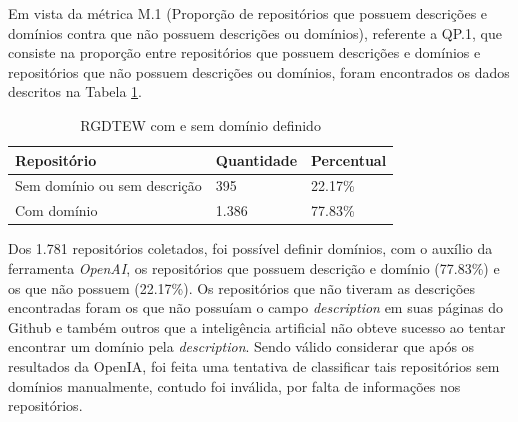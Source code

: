 \documentclass[12pt]{article}
\begin{document}
Em vista da métrica M.1 (Proporção de repositórios que possuem descrições e domínios contra que não possuem descrições ou domínios), referente a QP.1, que consiste na proporção entre repositórios que possuem descrições e domínios e repositórios que não possuem descrições ou domínios, foram encontrados os dados descritos na Tabela \ref{tab:descricao x sem descricao}{}.
\begin{table}[ht]
    \caption{RGDTEW com e sem domínio definido}
    \centering
    \label{tab:descricao x sem descricao}
        \begin{tabular}{|l|l|l|}
        \hline
        Repositório & Quantidade & Percentual\\
        \hline
        Sem domínio ou sem descrição & 395 & 22.17\%\\
        \hline
        Com domínio & 1.386 & 77.83\%\\
        \hline
        \end{tabular}
\end{table}
Dos 1.781 repositórios coletados, foi possível definir domínios, com o auxílio da ferramenta \emph{OpenAI}, os repositórios que possuem descrição e domínio (77.83\%) e os que não possuem (22.17\%). Os repositórios que não tiveram as descrições encontradas foram os que não possuíam o campo \emph{description} em suas páginas do Github e também outros que a inteligência artificial não obteve sucesso ao tentar encontrar um domínio pela \emph{description}. Sendo válido considerar que após os resultados da OpenIA, foi feita uma tentativa de classificar tais repositórios sem domínios manualmente, contudo foi inválida, por falta de informações nos repositórios. 
\end{document}
